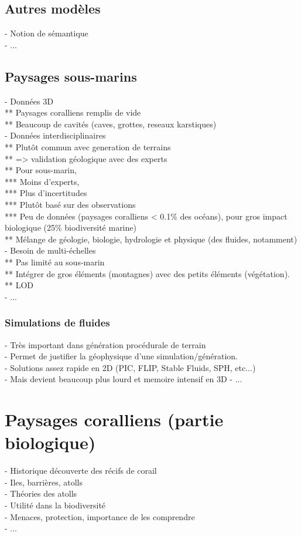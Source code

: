 \subsection{Autres modèles}
- Notion de sémantique \\
- ...

\subsection{Paysages sous-marins}
- Données 3D \\
** Paysages coralliens remplis de vide \\
** Beaucoup de cavités (caves, grottes, reseaux karstiques) \\
- Données interdisciplinaires \\
** Plutôt commun avec generation de terrains\\
** => validation géologique avec des experts \\
** Pour sous-marin, \\
*** Moins d'experts, \\
*** Plus d'incertitudes \\
*** Plutôt basé sur des observations \\
*** Peu de données (paysages coralliens < 0.1\% des océans), pour gros impact biologique (25\% biodiversité marine) \\
** Mélange de géologie, biologie, hydrologie et physique (des fluides, notamment) \\
- Besoin de multi-échelles \\
** Pas limité au sous-marin \\
** Intégrer de gros éléments (montagnes) avec des petits éléments (végétation). \\
** LOD \\
- ... 

\subsubsection{Simulations de fluides}
- Très important dans génération procédurale de terrain \\
- Permet de justifier la géophysique d'une simulation/génération. \\
- Solutions assez rapide en 2D (PIC, FLIP, Stable Fluids, SPH, etc...) \\
- Mais devient beaucoup plus lourd et memoire intensif en 3D
- ...



\section{Paysages coralliens (partie biologique)}
\label{sec:introduction_biology}
- Historique découverte des récifs de corail \\
- Iles, barrières, atolls \\
- Théories des atolls \\
- Utilité dans la biodiversité \\
- Menaces, protection, importance de les comprendre \\
- ...

